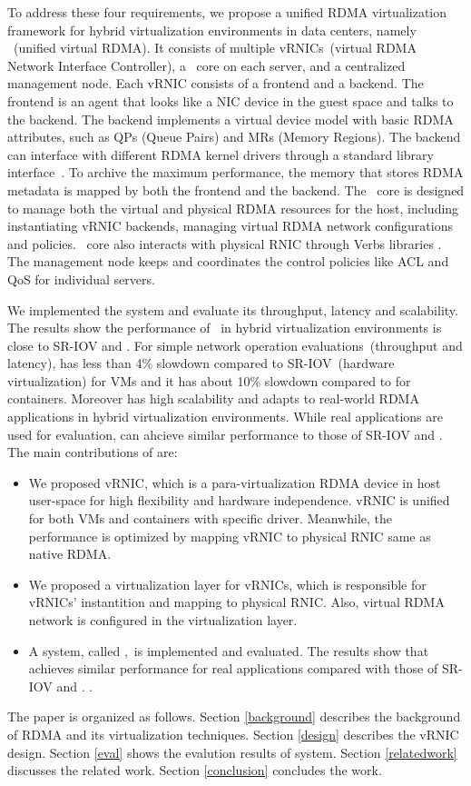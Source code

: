 To address these four requirements, we propose a unified RDMA virtualization framework for hybrid virtualization environments in data centers, namely \sys~(unified virtual RDMA). It consists of multiple vRNICs~(virtual RDMA Network Interface Controller), a \sys~core on each server, and a centralized management node.
Each vRNIC consists of a frontend and a backend. The frontend is an agent that looks like a NIC device in the guest space and talks to the backend. The backend implements a virtual device model with basic RDMA attributes, such as QPs (Queue Pairs) and MRs (Memory Regions). The backend can interface with different RDMA kernel drivers through a standard library interface~\cite{verbs}. To archive the maximum performance, the memory that stores RDMA metadata is mapped by both the frontend and the backend. 
The \sys~core is designed to manage both the virtual and physical RDMA resources for the host, including instantiating vRNIC backends, managing virtual RDMA network configurations and policies. \sys~core also interacts with physical RNIC through Verbs libraries \cite{verbs}.
The management node keeps and coordinates the control policies like ACL and QoS for individual servers.

We implemented the \sys system and evaluate its throughput, latency and scalability. The results show the performance of \sys~in hybrid virtualization environments is close to SR-IOV and \native. For simple network operation evaluations~(throughput and latency), \sys has less than 4\% slowdown compared to SR-IOV~(hardware virtualization) for VMs and it has about 10\% slowdown compared to \native for containers. Moreover \sys has high scalability and adapts to real-world RDMA applications in hybrid virtualization environments. While real applications are used for evaluation, \sys can ahcieve similar performance to those of SR-IOV and \native. The main contributions of \sys are:

\begin{itemize}
	\item We proposed vRNIC, which is a para-virtualization RDMA device in host user-space for high flexibility and hardware independence. vRNIC is unified for both VMs and containers with specific driver. Meanwhile, the performance is optimized by mapping vRNIC to physical RNIC same as native RDMA.
	
	\item We proposed a virtualization layer for vRNICs, which is responsible for vRNICs' instantition and mapping to physical RNIC. Also, virtual RDMA network is configured in the virtualization layer.
	
	\item A system, called \sys,~is implemented and evaluated. The results show that \sys achieves similar performance for real applications compared with those of SR-IOV and \native.  .
\end{itemize}
%
The paper is organized as follows. Section \ref{background} describes the background of RDMA and its virtualization techniques. Section \ref{design} describes the vRNIC design. %
Section \ref{eval} shows the evalution results of \sys system. Section \ref{relatedwork} discusses the related work. Section \ref{conclusion} concludes the work.
